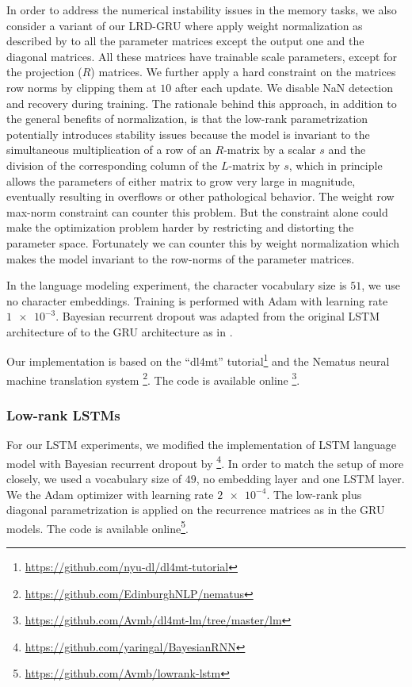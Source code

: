 \documentclass[11pt,a4paper]{article}
\begin{document}
In order to address the numerical instability issues in the memory tasks, we also consider a variant of our LRD-GRU where apply weight normalization as described by  to all the parameter matrices except the output one and the diagonal matrices. All these matrices have trainable scale parameters, except for the projection ($R$) matrices. We further apply a hard constraint on the matrices row norms by clipping them at $10$ after each update. We disable NaN detection and recovery during training.  
The rationale behind this approach, in addition to the general benefits of normalization, is that the low-rank parametrization potentially introduces stability issues because the model is invariant to the simultaneous multiplication of a row of an $R$-matrix by a scalar $s$ and the division of the corresponding column of the $L$-matrix by $s$, which in principle allows the parameters of either matrix to grow very large in magnitude, eventually resulting in overflows or other pathological behavior. The weight row max-norm constraint can counter this problem. But the constraint alone could make the optimization problem harder by restricting and distorting the parameter space. Fortunately we can counter this by weight normalization which makes the model invariant to the row-norms of the parameter matrices.


In the language modeling experiment, 
the character vocabulary size is $51$, we use no character embeddings. Training is performed with Adam with learning rate $\num{1e-3}$.
Bayesian recurrent dropout was adapted from the original LSTM architecture of  to the GRU architecture as in .

Our implementation is based on the ``dl4mt'' tutorial\footnote{\url{https://github.com/nyu-dl/dl4mt-tutorial}} and the Nematus neural machine translation system \footnote{\url{https://github.com/EdinburghNLP/nematus}}. The code is available online 
\footnote{\url{https://github.com/Avmb/dl4mt-lm/tree/master/lm}
}.

\subsubsection{Low-rank LSTMs}
\label{SEC:LSTMDETAIL}

For our LSTM experiments, we modified the implementation of LSTM language model with Bayesian recurrent dropout by \footnote{\url{https://github.com/yaringal/BayesianRNN}}. In order to match the setup of  more closely, we used a vocabulary size of $49$, no embedding layer and one LSTM layer.
We the Adam optimizer with learning rate $\num{2e-4}$.
The low-rank plus diagonal parametrization is applied on the recurrence matrices as in the GRU models.
The code is available online\footnote{
\url{https://github.com/Avmb/lowrank-lstm}
}.
\end{document}
